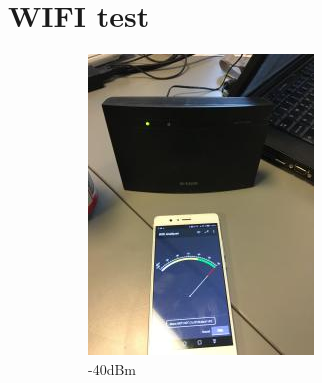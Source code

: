 \section{WIFI test}
\begin{figure}[h]
\centering
    \begin{subfigure}{.49\textwidth}
        \centering
        \includegraphics[width=\textwidth]{figures/image.jpg}
        \caption{-40dBm}
        \label{fig:wifitest1} 
    \end{subfigure}
    \begin{subfigure}{.49\textwidth}
        \centering

\end{subfigure}
\end{figure}
